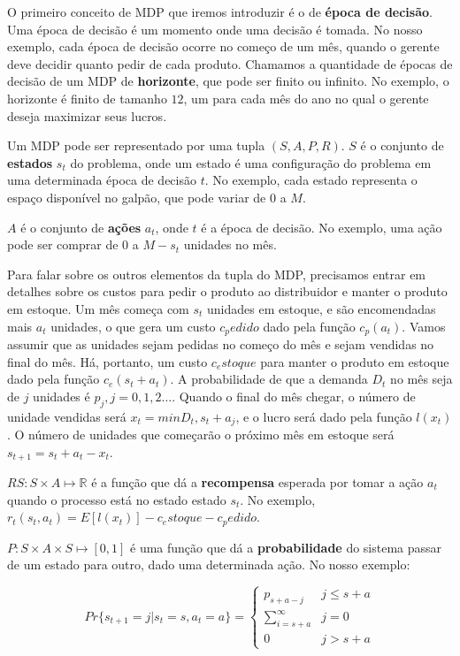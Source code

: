 \documentclass{book}
\renewcommand{\le}{\leqslant}
\begin{document}
O primeiro conceito de MDP que iremos introduzir é o de \textbf{época de decisão}. Uma época de
decisão é um momento onde uma decisão é tomada. No nosso exemplo, cada época de decisão ocorre
no começo de um mês, quando o gerente deve decidir quanto pedir de cada produto. Chamamos a
quantidade de épocas de decisão de um MDP de \textbf{horizonte}, que pode ser finito ou infinito.
No exemplo, o horizonte é finito de tamanho $12$, um para cada mês do ano no qual o gerente deseja
maximizar seus lucros.

Um MDP pode ser representado por uma tupla $(S, A, P, R)$. $S$ é o conjunto de \textbf{estados}
$s_t$ do problema, onde um estado é uma configuração do problema em uma determinada época de
decisão $t$. No exemplo, cada estado representa o espaço disponível no galpão, que pode variar
de $0$ a $M$.

$A$ é o conjunto de \textbf{ações} $a_t$, onde $t$ é a época de decisão. No exemplo, uma ação
pode ser comprar de $0$ a $M-s_t$ unidades no mês.

Para falar sobre os outros elementos da tupla do MDP, precisamos entrar em detalhes sobre os
custos para pedir o produto ao distribuidor e manter o produto em estoque. Um mês começa com $s_t$
unidades em estoque, e são encomendadas mais $a_t$ unidades, o que gera um custo $c_pedido$ dado
pela função $c_p(a_t)$. Vamos assumir que as unidades sejam pedidas no começo do mês e sejam vendidas
no final do mês. Há, portanto, um custo $c_estoque$ para manter o produto em estoque dado pela função
$c_e(s_t + a_t)$. A probabilidade de que a demanda $D_t$ no mês seja de $j$ unidades é $p_j, j = 0,1,2\ldots$.
Quando o final do mês chegar, o número de unidade vendidas será $x_t = min{D_t, s_t + a_j}$, e o lucro
será dado pela função $l(x_t)$. O número de unidades que começarão o próximo mês em estoque será
$s_{t+1}= s_t + a_t - x_t$.

$RS: S \times A \mapsto \mathbb{R}$ é a função que dá a \textbf{recompensa} esperada por tomar a ação $a_t$
quando o processo está no estado estado $s_t$. No exemplo, $r_t(s_t, a_t) = E[l(x_t)] - c_estoque - c_pedido$.

$P: S \times A \times S \mapsto [0,1]$ é uma função que dá a \textbf{probabilidade} do sistema passar de um estado
para outro, dado uma determinada ação. No nosso exemplo:

\begin{equation*}
  Pr\{s_{t+1} = j|s_t = s, a_t = a\} = \begin{cases}p_{s+a-j} &j\le s + a \\
                                                    \sum\limits_{i=s+a}^\infty &j=0 \\
                                                    0 & j >s+a\end{cases}
\end{equation*}
\end{document}

